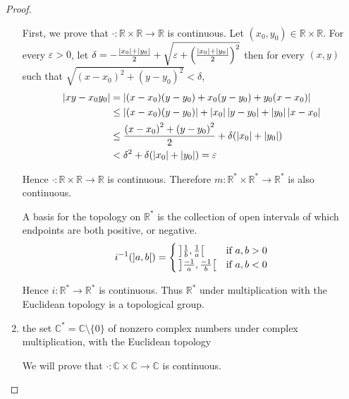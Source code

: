 \begin{proof}
\begin{enumerate}[label={(\alph*)}]
		      First, we prove that $\cdot: \mathbb{R}\times\mathbb{R}\to\mathbb{R}$ is continuous. Let $(x_{0}, y_{0})\in\mathbb{R}\times\mathbb{R}$. For every $\varepsilon > 0$, let $\delta = -\frac{\left\vert{x_{0}}\right\vert+\left\vert{y_{0}}\right\vert}{2} + \sqrt{\varepsilon + {\left(\frac{\left\vert{x_{0}}\right\vert+\left\vert{y_{0}}\right\vert}{2}\right)}^{2}}$ then for every $(x, y)$ such that $\sqrt{{(x - x_{0})}^{2} + {(y - y_{0})}^{2}} < \delta$,
		      \begin{align*}
			      \left\vert{xy - x_{0}y_{0}}\right\vert & = \left\vert{(x - x_{0})(y - y_{0}) + x_{0}(y - y_{0}) + y_{0}(x - x_{0})}\right\vert                        \\
			                            & \leq \left\vert{(x - x_{0})(y - y_{0})}\right\vert + \left\vert{x_{0}}\right\vert\left\vert{y - y_{0}}\right\vert + \left\vert{y_{0}}\right\vert\left\vert{x - x_{0}}\right\vert \\
			                            & \leq \frac{{(x - x_{0})}^{2} + {(y - y_{0})}^{2}}{2} + \delta(\left\vert{x_{0}}\right\vert + \left\vert{y_{0}}\right\vert)    \\
			                            & < \delta^{2} + \delta(\left\vert{x_{0}}\right\vert + \left\vert{y_{0}}\right\vert) = \varepsilon
		      \end{align*}

		      Hence $\cdot: \mathbb{R}\times\mathbb{R}\to \mathbb{R}$ is continuous. Therefore $m: \mathbb{R}^{*}\times\mathbb{R}^{*}\to \mathbb{R}^{*}$ is also continuous.

		      A basis for the topology on $\mathbb{R}^{*}$ is the collection of open intervals of which endpoints are both positive, or negative.
		      \[
			      i^{-1}(\left]{a, b}\right[) = \begin{cases}
				      \left]{\frac{1}{b}, \frac{1}{a}}\right[   & \text{if $a, b > 0$} \\
				      \left]{\frac{-1}{a}, \frac{-1}{b}}\right[ & \text{if $a, b < 0$}
			      \end{cases}
		      \]

		      Hence $i: \mathbb{R}^{*}\to \mathbb{R}^{*}$ is continuous. Thus $\mathbb{R}^{*}$ under multiplication with the Euclidean topology is a topological group.
		\item the set $\mathbb{C}^{*} = \mathbb{C}\setminus\{0\}$ of nonzero complex numbers under complex multiplication, with the Euclidean topology

		      We will prove that $\cdot: \mathbb{C}\times\mathbb{C}\to\mathbb{C}$ is continuous.


\end{enumerate}
\end{proof}

